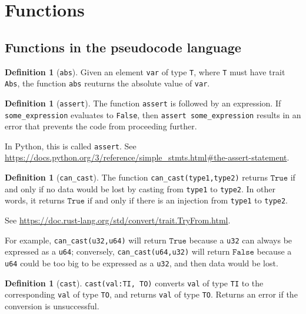 \documentclass[11pt,a4paper]{article}
\theoremstyle{definition}
\newtheorem{definition}[theorem]{Definition}
\newcommand{\True}{\texttt{True}}
\newcommand{\False}{\texttt{False}}
\newcommand{\inRust}[2]{See \url{#2}.}
\newcommand{\inPython}[2]{In Python, this is called \texttt{#1}. See \url{#2}.}
\newcommand{\iffText}{\text{if and only if}}
\begin{document}
\section{Functions}

\subsection{Functions in the pseudocode language}

\begin{definition}[\texttt{abs}]
    Given an element \texttt{var} of type \texttt{T}, where \texttt{T} must have trait \texttt{Abs}, the function \texttt{abs} reuturns the absolute value of \texttt{var}.
\end{definition}

\begin{definition}[\texttt{assert}] 
    The function \texttt{assert} is followed by an expression. If \texttt{some\_expression} evaluates to \texttt{False}, then \texttt{assert some\_expression} results in an error that prevents the code from proceeding further. 
    
    \inPython{\texttt{assert}}{https://docs.python.org/3/reference/simple_stmts.html\#the-assert-statement}
\end{definition}

\begin{definition}[\texttt{can\_cast}]
    The function \texttt{can\_cast(type1,type2)} returns $\True$ if and only if no data would be lost by casting from \texttt{type1} to \texttt{type2}. In other words, it returns $\True$ $\iffText$ there is an injection from \texttt{type1} to \texttt{type2}. 
    
    \inRust{std::convert::TryFrom}{https://doc.rust-lang.org/std/convert/trait.TryFrom.html}
\end{definition}

For example, \texttt{can\_cast(u32,u64)} will return $\True$ because a \texttt{u32} can always be expressed as a \texttt{u64}; conversely, \texttt{can\_cast(u64,u32)} will return $\False$ because a \texttt{u64} could be too big to be expressed as a \texttt{u32}, and then data would be lost.

\begin{definition}[\texttt{cast}]
    \texttt{cast(val:TI, TO)} converts \texttt{val} of type \texttt{TI} to the corresponding \texttt{val} of type \texttt{TO}, and returns \texttt{val} of type \texttt{TO}. Returns an error if the conversion is unsuccessful.
\end{definition}
\end{document}
